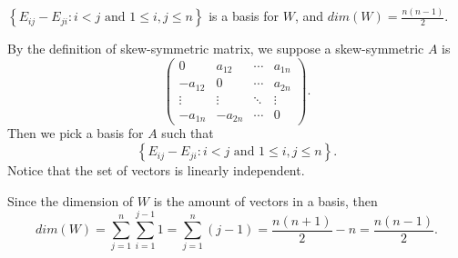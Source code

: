 \begin{Exercise}
\begin{answer}
$\left\{ E_{i j} - E_{j i}: i<j\text{ and } 1\leq i,j\leq n\right\}$ is a basis for $W$, and $dim(W) = \frac{n(n-1)}{2}$.
\end{answer}
\begin{solution}
By the definition of skew-symmetric matrix, we suppose a skew-symmetric $A$ is
$$
\begin{pmatrix}
0 & a_{1 2} & \cdots & a_{1 n} \\
-a_{1 2} & 0 & \cdots & a_{2 n} \\
\vdots & \vdots & \ddots & \vdots \\
-a_{1 n} & -a_{2 n} & \cdots & 0
\end{pmatrix}.
$$
Then we pick a basis for $A$ such that
$$
\left\{ E_{i j} - E_{j i}: i<j\text{ and } 1\leq i,j\leq n\right\}.
$$
Notice that the set of vectors is linearly independent.

Since the dimension of $W$ is the amount of vectors in a basis, then
$$
dim(W) = \sum_{j=1}^{n}\sum_{i=1}^{j-1} 1 = \sum_{j=1}^{n}(j-1) = \frac{n(n+1)}{2}-n = \frac{n(n-1)}{2}.
$$
\end{solution}
\end{Exercise}